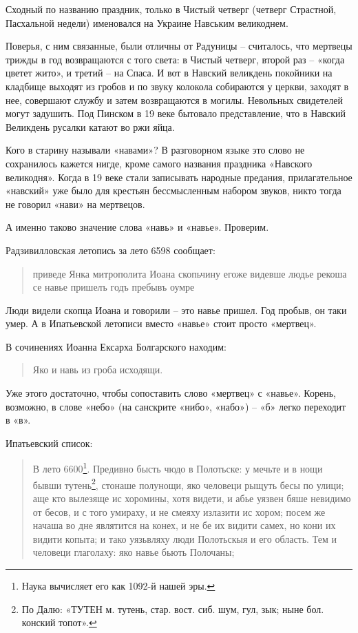 Сходный по названию праздник, только в Чистый четверг (четверг Страстной, Пасхальной недели) именовался на Украине Навським великоднем.

Поверья, с ним связанные, были отличны от Радуницы – считалось, что мертвецы трижды в год возвращаются с того света: в Чистый четверг, второй раз – «когда цветет жито», и третий – на Спаса. И вот в Навский великдень покойники на кладбище выходят из гробов и по звуку колокола собираются у церкви, заходят в нее, совершают службу и затем возвращаются в могилы. Невольных свидетелей могут задушить. Под Пинском в 19 веке бытовало представление, что в Навский Великдень русалки катают во ржи яйца.

Кого в старину называли «навами»? В разговорном языке это слово не сохранилось кажется нигде, кроме самого названия праздника «Навского великодня». Когда в 19 веке стали записывать народные предания, прилагательное «навский» уже было для крестьян бессмысленным набором звуков, никто тогда не говорил «нави» на мертвецов.

А именно таково значение слова «навь» и «навье». Проверим.

Радзивилловская летопись за лето 6598 сообщает: 

\begin{quotation}
приведе Янка митрополита Иоана скопьчину егоже видевше людье рекоша се навье пришелъ годъ пребывъ оумре
\end{quotation}

Люди видели скопца Иоана и говорили – это навье пришел. Год пробыв, он таки умер. А в Ипатьевской летописи вместо «навье» стоит просто «мертвец».

В сочинениях Иоанна Ексарха Болгарского находим:

\begin{quotation}
Яко и навь из гроба исходящи.
\end{quotation}

Уже этого достаточно, чтобы сопоставить слово «мертвец» с «навье». Корень, возможно, в слове «небо» (на санскрите «нибо», «набо») – «б» легко переходит в «в».

Ипатьевский список:

\begin{quotation}
В лето 6600\footnote{Наука вычисляет его как 1092-й нашей эры.}.
Предивно бысть чюдо в Полотьске: у мечьте и в нощи бывши тутень\footnote{По Далю: «ТУТЕН м. тутень, стар. вост. сиб. шум, гул, зык; ныне бол. конский топот».}, стонаше полунощи, яко человеци рыщуть бесы по улици; аще кто вылезяще ис хоромины, хотя видети, и абье уязвен бяше невидимо от бесов, и с того умираху, и не смеяху излазити ис хором; посем же начаша во дне являтится на конех, и не бе их видити самех, но кони их видити копыта; и тако уязьвляху люди Полотьскыя и его область. Тем и человеци глаголаху: яко навье бьють Полочаны;
\end{quotation}

